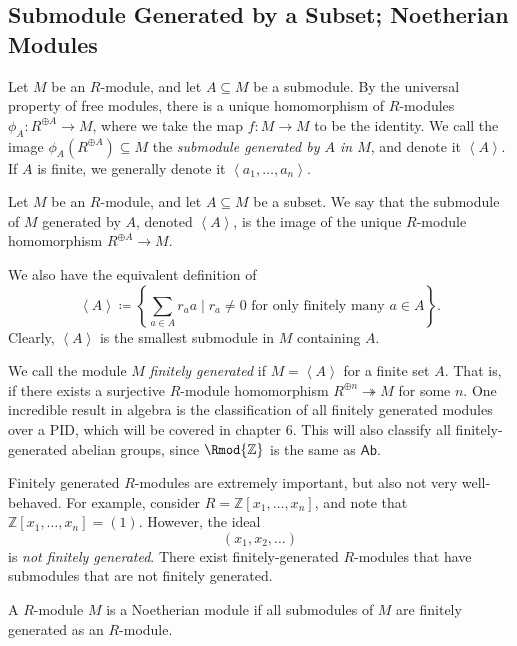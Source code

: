 \subsection{Submodule Generated by a Subset; Noetherian Modules}
Let $M$ be an $R$-module, and let $A\subseteq M$ be a submodule. By the universal property of free modules, there is a unique homomorphism of $R$-modules $\phi_A : R^{\oplus A} \to M$, where we take the map $f : M \to M$ to be the identity. We call the image $\phi_A\left( R^{\oplus A} \right) \subseteq M$ the \emph{submodule generated by $A$ in $M$}, and denote it $\left\langle A \right\rangle $. If $A$ is finite, we generally denote it $\left\langle a_1, \dots, a_n  \right\rangle $.
\begin{definition}\label{dfn:3.6.3}
	Let $M$ be an $R$-module, and let $A\subseteq M$ be a subset. We say that the submodule of $M$ generated by $A$, denoted $\left\langle A \right\rangle $, is the image of the unique $R$-module homomorphism $R^{\oplus A}\to M$.
\end{definition}

We also have the equivalent definition of
\[
	\left\langle A \right\rangle \coloneqq \left\{ \sum_{a\in A} r_a a \mid r_a \neq 0 \text{ for only finitely many }a\in A \right\} 
.\]
Clearly, $\left\langle A \right\rangle $ is the smallest submodule in $M$ containing $A$.

We call the module $M$ \emph{finitely generated} if $M=\left\langle A \right\rangle $ for a finite set $A$. That is, if there exists a surjective $R$-module homomorphism $R^{\oplus n}\twoheadrightarrow M$ for some $n$. One incredible result in algebra is the classification of all finitely generated modules over a PID, which will be covered in chapter 6. This will also classify all finitely-generated abelian groups, since $\Rmod{\mathbb{Z}} $ is the same as $\mathsf{Ab}$.

Finitely generated $R$-modules are extremely important, but also not very well-behaved. For example, consider $R=\mathbb{Z}[x_1, \dots, x_n ]$, and note that $\mathbb{Z}[x_1, \dots, x_n ]=(1)$. However, the ideal
\[
	(x_1,x_2, \ldots)
\]
is \emph{not finitely generated}. There exist finitely-generated $R$-modules that have submodules that are not finitely generated.
\begin{definition}\label{dfn:3.6.4}
	A $R$-module $M$ is a Noetherian module if all submodules of $M$ are finitely generated as an $R$-module.
\end{definition}

